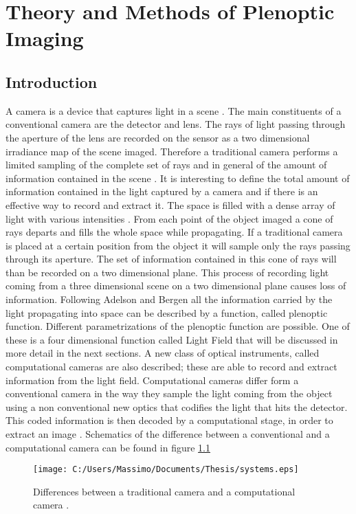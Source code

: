 \chapter{Theory and Methods of Plenoptic Imaging}
\label{chap:chapter1}
\section{Introduction}
\label{sec:intro1}
A camera is a device that captures light in a scene \cite{zhou2011computational}. The main constituents of a conventional camera are the detector and lens. The rays of light passing through the aperture of the lens are recorded on the sensor as a two dimensional irradiance map of the scene imaged. Therefore a traditional camera performs a limited sampling of the complete set of rays and in general of the amount of information contained in the scene \cite{nayar2006computational}. It is interesting to define the total amount of information contained in the light captured by a camera and if there is an effective way to record and extract it. The space is filled with a dense array of light with various intensities \cite{adelson1991plenoptic}. From each point of the object imaged a cone of rays departs and fills the whole space while propagating. If a traditional camera is placed at a certain position from the object it will sample only the rays passing through its aperture. The set of information contained in this cone of rays will than be recorded on a two dimensional plane. This process of recording light coming from a three dimensional scene on a two dimensional plane causes loss of information. Following Adelson and Bergen \cite{adelson1991plenoptic} all the information carried by the light propagating into space can be described by a function, called plenoptic function. Different parametrizations of the plenoptic function are possible. One of these is a four dimensional function called Light Field that will be discussed in more detail in the next sections. A new class of optical instruments, called computational cameras are also described; these are able to record and extract information from the light field. Computational cameras differ form a conventional camera in the way they sample the light coming from the object using a non conventional new optics that codifies the light that hits the detector. This coded information is then decoded by a computational stage, in order to extract an image \cite{nayar2006computational}. Schematics of the difference between a conventional and a computational camera can be found in figure \ref{fig:systems}
\begin{figure}[H]
	\centering
	\texttt{[image: C:/Users/Massimo/Documents/Thesis/systems.eps]}
	\caption{\label{fig:systems}Differences between a traditional camera and a computational camera \cite{nayar2006computational}.}
\end{figure}
